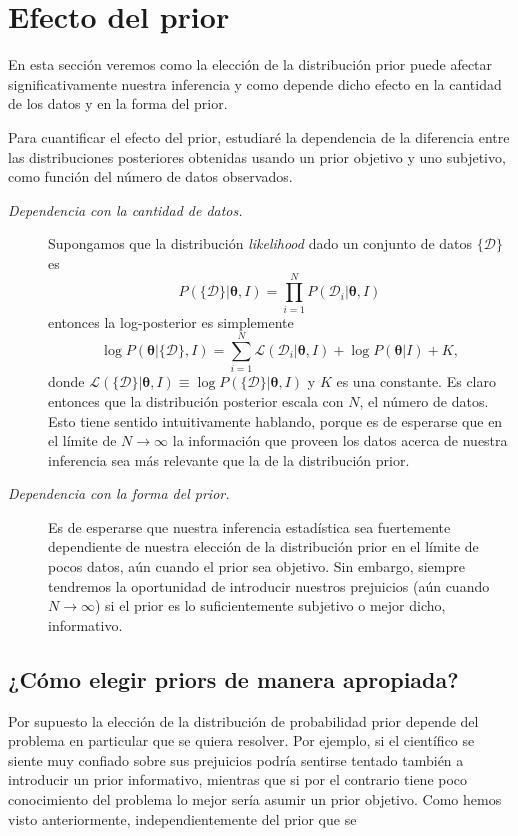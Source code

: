\documentclass[a4paper,twoside]{article}
\newcommand{\hip}{\ensuremath{\bm{\theta}}\xspace}
\newcommand{\dat}{\ensuremath{\{\mathcal{D}\}}\xspace}
\begin{document}
\section{Efecto del prior}
%
En esta sección veremos como la elección de la distribución prior puede afectar significativamente
nuestra inferencia y como depende dicho efecto en la cantidad de los datos y en la forma del prior.

Para cuantificar el efecto del prior, estudiaré la dependencia de la diferencia entre las
distribuciones posteriores obtenidas usando un prior objetivo y uno subjetivo, como función del
número de datos observados.

\begin{description}
%
\item[\textit{\color{teal} Dependencia con la cantidad de datos.}] Supongamos que la distribución
\emph{likelihood} dado un conjunto de datos $\dat$ es
%
$$
P(\dat|\hip,I) = \prod_{i=1}^N P(\mathcal{D}_i|\hip,I)
$$
%
entonces la log-posterior es simplemente
%
$$
\log{P(\hip|\dat,I)} = \sum_{i=1}^N\mathcal{L}(\mathcal{D}_i|\hip,I) + \log{P(\hip|I)} + K,
$$
%
donde $\mathcal{L}(\dat|\hip,I)\equiv\log{P(\dat|\hip,I)}$ y $K$ es una constante. Es claro entonces
que la distribución posterior escala con $N$, el número de datos. Esto tiene sentido intuitivamente
hablando, porque es de esperarse que en el límite de $N\to\infty$ la información que proveen los
datos acerca de nuestra inferencia sea más relevante que la de la distribución prior.
%
\item[\textit{\color{teal} Dependencia con la forma del prior.}] Es de esperarse que nuestra
inferencia estadística sea fuertemente dependiente de nuestra elección de la distribución prior en
el límite de pocos datos, aún cuando el prior sea objetivo. Sin embargo, siempre tendremos la
oportunidad de introducir nuestros prejuicios (aún cuando $N\to\infty$) si el prior es lo
suficientemente subjetivo o mejor dicho, informativo.
%
\end{description}

\subsection*{¿Cómo elegir priors de manera apropiada?}
%
Por supuesto la elección de la distribución de probabilidad prior depende del problema en particular
que se quiera resolver. Por ejemplo, si el científico se siente muy confiado sobre sus prejuicios
podría sentirse tentado también a introducir un prior informativo, mientras que si por el contrario
tiene poco conocimiento del problema lo mejor sería asumir un prior objetivo. Como hemos visto
anteriormente, independientemente del prior que se
\end{document}
